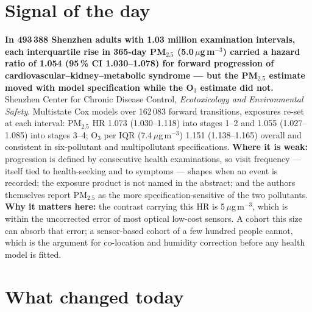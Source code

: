 \documentclass[10pt]{article}
\begin{document}
\vspace{6mm}

\section*{\sffamily\bfseries\color{Deep}Signal of the day}
\vspace{-1.5mm}{\color{Amber}\rule{\linewidth}{1.1pt}}\vspace{2.5mm}

\begin{keybox}
{\sffamily\bfseries\small\color{Deep}In 493\,388 Shenzhen adults with 1.03 million examination intervals, each interquartile rise in 365-day PM$_{2.5}$ (5.0\,$\mu$g\,m$^{-3}$) carried a hazard ratio of 1.054 (95\,\% CI 1.030--1.078) for forward progression of cardiovascular--kidney--metabolic syndrome --- but the PM$_{2.5}$ estimate moved with model specification while the O$_3$ estimate did not.}\\[1.4mm]
\footnotesize
Shenzhen Center for Chronic Disease Control, \textit{Ecotoxicology and Environmental Safety}. Multistate Cox models over 162\,083 forward transitions, exposures re-set at each interval: PM$_{2.5}$ HR 1.073 (1.030--1.118) into stages 1--2 and 1.055 (1.027--1.085) into stages 3--4; O$_3$ per IQR (7.4\,$\mu$g\,m$^{-3}$) 1.151 (1.138--1.165) overall and consistent in six-pollutant and multipollutant specifications.
\textbf{Where it is weak:} progression is defined by consecutive health examinations, so visit frequency --- itself tied to health-seeking and to symptoms --- shapes when an event is recorded; the exposure product is not named in the abstract; and the authors themselves report PM$_{2.5}$ as the more specification-sensitive of the two pollutants.
\textbf{Why it matters here:} the contrast carrying this HR is 5\,$\mu$g\,m$^{-3}$, which is within the uncorrected error of most optical low-cost sensors. A cohort this size can absorb that error; a sensor-based cohort of a few hundred people cannot, which is the argument for co-location and humidity correction before any health model is fitted.\par
\end{keybox}

\vspace{3mm}

\section*{\sffamily\bfseries\color{Deep}What changed today}
\vspace{-1.5mm}{\color{Amber}\rule{\linewidth}{1.1pt}}\vspace{2.5mm}
\end{document}
